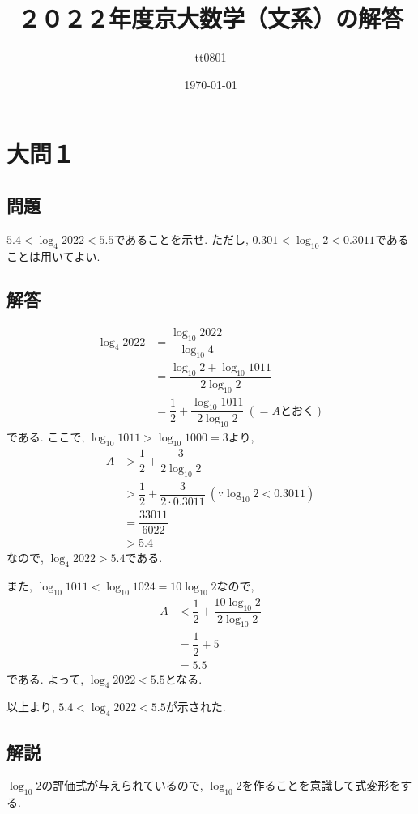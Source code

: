 \documentclass[dvipdfmx,a4paper]{jsarticle}
\title{２０２２年度京大数学（文系）の解答}
\author{tt0801}
\date{\today}
\newcommand{\2}{I\hspace{-1pt}I}
\newcommand{\3}{I\hspace{-1pt}I\hspace{-1pt}I}
\begin{document}
    \maketitle
    \section{大問１}
    \subsection{問題}
    $5.4 < \log_4 2022 < 5.5$であることを示せ. ただし, $0.301 < \log_{10} 2 < 0.3011$であることは用いてよい. 


    \subsection{解答}
    \begin{align*}
        \log_4 2022 &= \dfrac{\log_{10} 2022}{\log_{10} 4} \\
            &= \dfrac{\log_{10} 2 + \log_{10} 1011}{2\log_{10} 2} \\
            &= \dfrac{1}{2} + \dfrac{\log_{10} 1011}{2\log_{10} 2} \ (=A \mathrm{とおく})
    \end{align*}
    である. ここで, $\log_{10} 1011 > \log_{10} 1000 = 3$より, 
    \begin{align*}
        A & > \dfrac{1}{2} + \dfrac{3}{2\log_{10} 2} \\
        & > \dfrac{1}{2} + \dfrac{3}{2\cdot 0.3011} \ (\because \log_{10} 2 < 0.3011)\\
        &= \dfrac{33011}{6022} \\
        &> 5.4
    \end{align*}
    なので, $\log_4 2022 > 5.4$である. 
    
    また, $\log_{10} 1011 < \log_{10} 1024 = 10 \log_{10} 2$なので, 
    \begin{align*}
        A & < \dfrac{1}{2} + \dfrac{10 \log_{10} 2}{2\log_{10} 2} \\
        &= \dfrac{1}{2} + 5\\
        &= 5.5
    \end{align*}
    である. よって, $\log_4 2022 < 5.5$となる. 

    以上より, $5.4 < \log_4 2022 < 5.5$が示された. 


    \subsection{解説}
    $\log_{10} 2$の評価式が与えられているので, $\log_{10} 2$を作ることを意識して式変形をする. 
\end{document}
